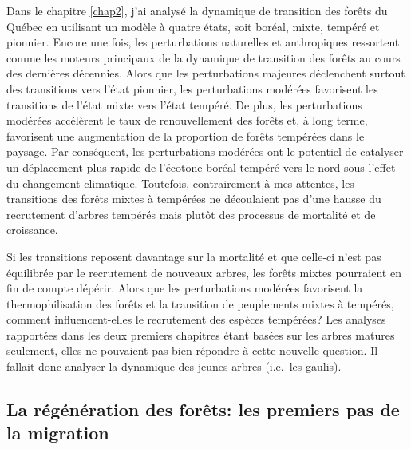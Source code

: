 Dans le chapitre \ref{chap2}, j'ai analysé la dynamique de transition
des forêts du Québec en utilisant un modèle à quatre états, soit boréal,
mixte, tempéré et pionnier. Encore une fois, les perturbations
naturelles et anthropiques ressortent comme les moteurs principaux de la
dynamique de transition des forêts au cours des dernières décennies.
Alors que les perturbations majeures déclenchent surtout des transitions
vers l'état pionnier, les perturbations modérées favorisent les
transitions de l'état mixte vers l'état tempéré. De plus, les
perturbations modérées accélèrent le taux de renouvellement des forêts
et, à long terme, favorisent une augmentation de la proportion de forêts
tempérées dans le paysage. Par conséquent, les perturbations modérées
ont le potentiel de catalyser un déplacement plus rapide de l'écotone
boréal-tempéré vers le nord sous l'effet du changement climatique.
Toutefois, contrairement à mes attentes, les transitions des forêts
mixtes à tempérées ne découlaient pas d'une hausse du recrutement
d'arbres tempérés mais plutôt des processus de mortalité et de
croissance.

Si les transitions reposent davantage sur la mortalité et que celle-ci
n'est pas équilibrée par le recrutement de nouveaux arbres, les forêts
mixtes pourraient en fin de compte dépérir. Alors que les perturbations
modérées favorisent la thermophilisation des forêts et la transition de
peuplements mixtes à tempérés, comment influencent-elles le recrutement
des espèces tempérées? Les analyses rapportées dans les deux premiers
chapitres étant basées sur les arbres matures seulement, elles ne
pouvaient pas bien répondre à cette nouvelle question. Il fallait donc
analyser la dynamique des jeunes arbres (i.e.~les gaulis).

\hypertarget{la-ruxe9guxe9nuxe9ration-des-foruxeats-les-premiers-pas-de-la-migration}{%
\subsection{La régénération des forêts: les premiers pas de la
migration}\label{la-ruxe9guxe9nuxe9ration-des-foruxeats-les-premiers-pas-de-la-migration}}

